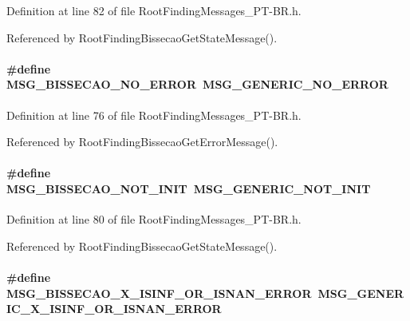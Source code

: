 Definition at line 82 of file RootFindingMessages\_\-PT-BR.h.

Referenced by RootFindingBissecaoGetStateMessage().\hypertarget{group____messages_g1327a0d7098c8506ebbba8fa51a2861c}{
\paragraph[MSG\_\-BISSECAO\_\-NO\_\-ERROR]{\setlength{\rightskip}{0pt plus 5cm}\#define MSG\_\-BISSECAO\_\-NO\_\-ERROR~MSG\_\-GENERIC\_\-NO\_\-ERROR}\hfill}
\label{group____messages_g1327a0d7098c8506ebbba8fa51a2861c}




Definition at line 76 of file RootFindingMessages\_\-PT-BR.h.

Referenced by RootFindingBissecaoGetErrorMessage().\hypertarget{group____messages_g532d2bf3026df42582d5fa103bbc3188}{
\paragraph[MSG\_\-BISSECAO\_\-NOT\_\-INIT]{\setlength{\rightskip}{0pt plus 5cm}\#define MSG\_\-BISSECAO\_\-NOT\_\-INIT~MSG\_\-GENERIC\_\-NOT\_\-INIT}\hfill}
\label{group____messages_g532d2bf3026df42582d5fa103bbc3188}




Definition at line 80 of file RootFindingMessages\_\-PT-BR.h.

Referenced by RootFindingBissecaoGetStateMessage().\hypertarget{group____messages_g40526857730e9af294e61ff82c37c989}{
\paragraph[MSG\_\-BISSECAO\_\-X\_\-ISINF\_\-OR\_\-ISNAN\_\-ERROR]{\setlength{\rightskip}{0pt plus 5cm}\#define MSG\_\-BISSECAO\_\-X\_\-ISINF\_\-OR\_\-ISNAN\_\-ERROR~MSG\_\-GENERIC\_\-X\_\-ISINF\_\-OR\_\-ISNAN\_\-ERROR}\hfill}
\label{group____messages_g40526857730e9af294e61ff82c37c989}




